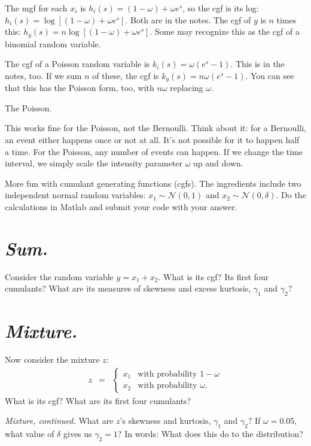 \documentclass[11pt]{exam}
\begin{document}
\begin{questions}
\begin{solution}
\begin{parts}
\item The mgf for each $x_i$ is
$ h_i (s) = (1-\omega) + \omega e^s $,
so the cgf is its log:  $h_i (s) = \log [(1-\omega) + \omega e^s] $.
Both are in the notes.
The cgf of $y$ is $n$ times this:  $h_y (s) = n \log [(1-\omega) + \omega e^s] $.
Some may recognize this as the cgf of a binomial random variable.
\item The cgf of a Poisson random variable is
$ k_i(s) = \omega (e^s-1) $.
This is in the notes, too.
If we sum $n$ of these, the cgf is $ k_y(s) = n \omega (e^s-1) $.
You can see that this has the Poisson form, too, with $n\omega$
replacing $\omega$.
\item The Poisson.
\item This works fine for the Poisson, not the Bernoulli.
Think about it:  for a Bernoulli, an event either happens once or not at all.
It's not possible for it to happen half a time.
For the Poisson, any number of events can happen.
If we change the time interval, we simply scale the intensity parameter $\omega$
up and down.
\end{parts}
\end{solution}


More fun with cumulant generating functions (cgfs).
The ingredients include two independent normal random variables:
$ x_1 \sim \mathcal{N}(0,1)$ and $ x_2 \sim \mathcal{N}(0,\delta)$.
Do the calculations in Matlab and submit your code with your answer.
%
\begin{parts}
\part {\it Sum.\/}  Consider the random variable $y = x_1 + x_2$.
What is its cgf?  Its first four cumulants?
What are its measures of skewness and excess kurtosis, $\gamma_1$ and $\gamma_2$?

\part {\it Mixture.\/}  Now consider the mixture $z$:
\begin{eqnarray*}
    z &=& \left\{
            \begin{array}{ll}
            x_1   & \mbox{with probability } 1-\omega \\
            x_2 & \mbox{with probability } \omega .
            \end{array}
            \right.
\end{eqnarray*}
What is its cgf?
What are its first four cumulants?
\item {\it Mixture, continued.\/}
What are $z$'s skewness and kurtosis, $\gamma_1$ and $\gamma_2$?
If $\omega = 0.05$, what value of $\delta$ gives us $\gamma_2 =1 $?
In words:  What does this do to the distribution?
\end{parts}


\end{questions}
\end{document}
